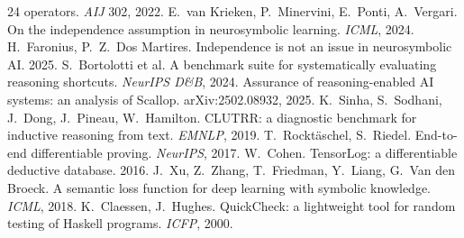 \documentclass[10pt]{article}
\theoremstyle{remark}
\begin{document}
\begin{thebibliography}{24}
operators. \emph{AIJ} 302, 2022.
 E.~van Krieken, P.~Minervini, E.~Ponti, A.~Vergari. On the independence assumption
in neurosymbolic learning. \emph{ICML}, 2024.
 H.~Faronius, P.~Z.~Dos Martires. Independence is not an issue in
neurosymbolic AI. 2025.
 S.~Bortolotti et al. A benchmark suite for systematically evaluating reasoning
shortcuts. \emph{NeurIPS D\&B}, 2024.
 Assurance of reasoning-enabled AI systems: an analysis of Scallop.
arXiv:2502.08932, 2025.
 K.~Sinha, S.~Sodhani, J.~Dong, J.~Pineau, W.~Hamilton. CLUTRR: a diagnostic
benchmark for inductive reasoning from text. \emph{EMNLP}, 2019.
 T.~Rockt\"aschel, S.~Riedel. End-to-end differentiable proving. \emph{NeurIPS},
2017.
 W.~Cohen. TensorLog: a differentiable deductive database. 2016.
 J.~Xu, Z.~Zhang, T.~Friedman, Y.~Liang, G.~Van den Broeck. A semantic loss function
for deep learning with symbolic knowledge. \emph{ICML}, 2018.
 K.~Claessen, J.~Hughes. QuickCheck: a lightweight tool for random testing of
Haskell programs. \emph{ICFP}, 2000.
\end{thebibliography}
\end{document}
